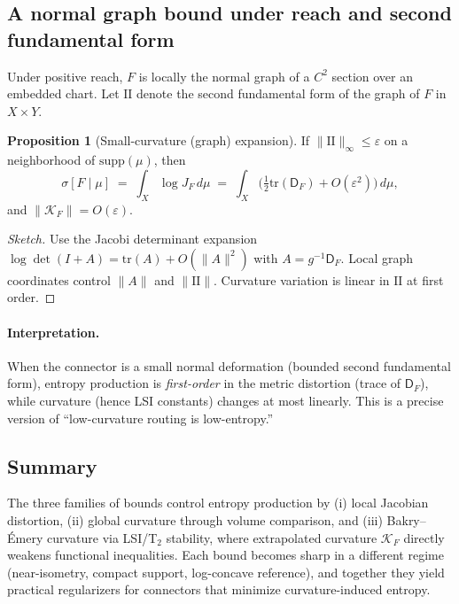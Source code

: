 \documentclass{article}
\theoremstyle{definition}
\newtheorem{proposition}[theorem]{Proposition}
\begin{document}
\subsection{A normal graph bound under reach and second fundamental form}

Under positive reach, \(F\) is locally the normal graph of a \(C^2\) section over
an embedded chart. Let \(\mathrm{II}\) denote the second fundamental form of the
graph of \(F\) in \(X\times Y\).

\begin{proposition}[Small-curvature (graph) expansion]
\label{prop:graph-entropy}
If \(\|\mathrm{II}\|_\infty \le \varepsilon\) on a neighborhood of \(\mathrm{supp}(\mu)\),
then
\[
\sigma[F\mid \mu] \;=\; \int_X \log J_F\, d\mu
\;=\; \int_X \Big(\tfrac{1}{2}\mathrm{tr}(\mathsf{D}_F) + O(\varepsilon^2)\Big)\, d\mu,
\]
and
\(
\|\mathcal{K}_F\| = O(\varepsilon).
\)
\end{proposition}

\begin{proof}[Sketch]
Use the Jacobi determinant expansion
\(\log\det(I+A)=\mathrm{tr}(A)+O(\|A\|^2)\) with
\(A=g^{-1}\mathsf{D}_F\). Local graph coordinates control \(\|A\|\) and \(\|\mathrm{II}\|\).
Curvature variation is linear in \(\mathrm{II}\) at first order.
\end{proof}

\paragraph{Interpretation.}
When the connector is a small normal deformation (bounded second fundamental
form), entropy production is \emph{first-order} in the metric distortion
(trace of \(\mathsf{D}_F\)), while curvature (hence LSI constants) changes at
most linearly. This is a precise version of ``low-curvature routing is
low-entropy.''

\subsection{Summary}
The three families of bounds control entropy production by (i) local Jacobian
distortion, (ii) global curvature through volume comparison, and (iii)
Bakry--Émery curvature via LSI/T\(_2\) stability, where extrapolated curvature
\(\mathcal{K}_F\) directly weakens functional inequalities. Each bound becomes
sharp in a different regime (near-isometry, compact support, log-concave
reference), and together they yield practical regularizers for connectors that
minimize curvature-induced entropy.
\end{document}
